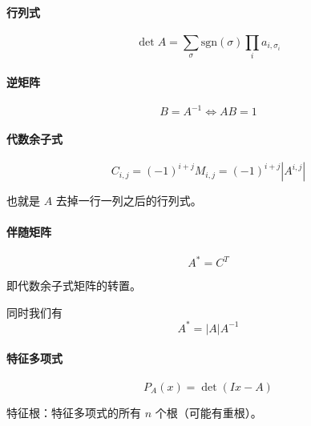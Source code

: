 \paragraph{行列式}
$$ \det A = \sum_{\sigma} \text{sgn}(\sigma) \prod_{i}a_{i, \sigma_i} $$

\paragraph{逆矩阵}
$$ B = A^{-1} \iff AB = 1 $$

\paragraph{代数余子式}
$$ C_{i, j} = (-1) ^ {i + j} M_{i, j} = (-1) ^ {i + j} \left| A ^ {i, j} \right| $$

也就是 $A$ 去掉一行一列之后的行列式。

\paragraph{伴随矩阵}
$$ A^{*} = C^T $$

即代数余子式矩阵的转置。

同时我们有 $$ A^{*} = |A| A^{-1}$$

\paragraph{特征多项式}
$$ P_A(x) = \det \left(Ix - A\right) $$

特征根：特征多项式的所有 $n$ 个根（可能有重根）。
